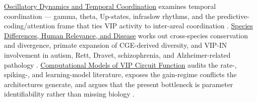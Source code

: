 \documentclass[11pt]{article}
\begin{document}
\href{/oscillatory-dynamics}{Oscillatory Dynamics and Temporal Coordination} examines temporal coordination --- gamma, theta, Up-states, infraslow rhythms, and the predictive-coding/attention frame that ties VIP activity to inter-areal coordination \citep{Veit2023, Hertag2020, Hertag2021, Shipp2016, Francavilla2018a}. \href{/disease-translational}{Species Differences, Human Relevance, and Disease} works out cross-species conservation and divergence, primate expansion of CGE-derived diversity, and VIP-IN involvement in autism, Rett, Dravet, schizophrenia, and Alzheimer-related pathology \citep{Hodge2019, Boldog2018, Chartrand2023, Bakken2021a, Bakken2021b, Krienen2020, Goff2023, Mcfarlan2024a}. \href{/computational-models}{Computational Models of VIP Circuit Function} audits the rate-, spiking-, and learning-model literature, exposes the gain-regime conflicts the architectures generate, and argues that the present bottleneck is parameter identifiability rather than missing biology \citep{Litwinkumar2016, Garciadelmolino2017, Veit2023, Bos2025, Hartung2024, Tahvili2025a, Tahvili2025b, Reimann2026, Sanzeni2020, Lee2025, Sabri2024}.
\end{document}
